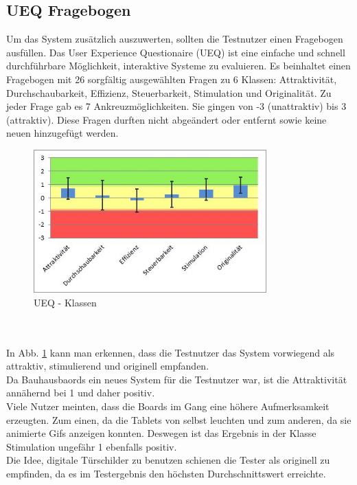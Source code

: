 \subsection{UEQ Fragebogen}\label{UEQ Fragebogen}
Um das System zusätzlich auszuwerten, sollten die Testnutzer einen Fragebogen ausfüllen.
Das User Experience Questionaire (UEQ) ist eine einfache und schnell durchführbare Möglichkeit, interaktive Systeme zu evaluieren.
Es beinhaltet einen Fragebogen mit 26 sorgfältig ausgewählten Fragen zu 6 Klassen: Attraktivität, Durchschaubarkeit, Effizienz, Steuerbarkeit, Stimulation und Originalität.
Zu jeder Frage gab es 7 Ankreuzmöglichkeiten. Sie gingen von -3 (unattraktiv) bis 3 (attraktiv).
Diese Fragen durften nicht abgeändert oder entfernt sowie keine neuen hinzugefügt werden.
\begin{figure}[h!]
  \centering
    \includegraphics[width=0.8\textwidth]{./img/scales_better.jpg}
  \caption{UEQ - Klassen}
  \label{img:UEQScales}
\end{figure}
\\
\\
In Abb. \ref{img:UEQScales} kann man erkennen, dass die Testnutzer das System vorwiegend als attraktiv, stimulierend und originell empfanden.
\\
Da Bauhausbaords ein neues System für die Testnutzer war, ist die Attraktivität annähernd bei 1 und daher positiv.
\\
Viele Nutzer meinten, dass die Boards im Gang eine höhere Aufmerksamkeit erzeugten.
Zum einen, da die Tablets von selbst leuchten und zum anderen, da sie animierte Gifs anzeigen konnten.
Deswegen ist das Ergebnis in der Klasse Stimulation ungefähr 1 ebenfalls positiv.
\\
Die Idee, digitale Türschilder zu benutzen schienen die Tester als originell zu empfinden, da es im Testergebnis den höchsten Durchschnittswert erreichte.
